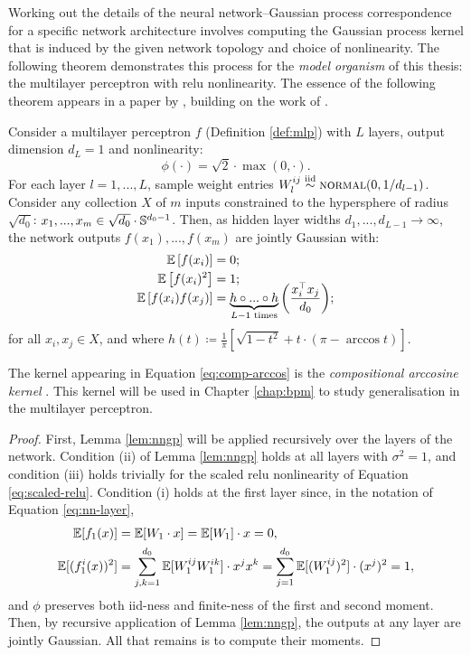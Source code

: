 \begin{refsection}
Working out the details of the neural network--Gaussian process correspondence for a specific network architecture involves computing the Gaussian process kernel that is induced by the given network topology and choice of nonlinearity. The following theorem demonstrates this process for the \textit{model organism} of this thesis: the multilayer perceptron with relu nonlinearity. The essence of the following theorem appears in a paper by \citet{lee2018deep}, building on the work of \citet{choandsaul}.

\begin{theorem}\label{thm:relu} Consider a multilayer perceptron $f$ (Definition \ref{def:mlp}) with $L$ layers, output dimension $d_L=1$ and nonlinearity:
\begin{equation}\label{eq:scaled-relu}
    \phi(\cdot) = \sqrt{2}\cdot\max(0,\cdot).
\end{equation}
For each layer $l=1,...,L$, sample weight entries $W_l^{ij} \overset{\mathrm{iid}}{\sim} \textsc{normal}(0,1/d_{l-1})$. Consider any collection $X$ of $m$ inputs constrained to the hypersphere of radius $\sqrt{d_0}$: $x_1, ..., x_m\in\sqrt{d_0}\cdot \mathbb{S}^{d_0-1}$. Then, as hidden layer widths $d_1,...,d_{L-1}\to \infty$, the network outputs $f(x_1),...,f(x_m)$ are jointly Gaussian with:
\begin{align}
\operatorname{\mathbb{E}} \left[ f(x_i) \right] &= 0;\\
\operatorname{\mathbb{E}} \smash{\left[ f(x_i)^2 \right]} &= 1;\\ 
\operatorname{\mathbb{E}} \left[ f(x_i) f(x_j)\right] &= \underbrace{h \circ ... \circ h}_{L-1\text{  times}}\smash{\left(\frac{x_i^\top x_j}{d_0}\right)}; \label{eq:comp-arccos}
\end{align}
for all $x_i, x_j \in X$, and where $h(t)\coloneqq  \tfrac{1}{\pi}\left[\sqrt{1-t^2} + t\cdot(\pi- \arccos t)\right]$.
\end{theorem}

The kernel appearing in Equation \ref{eq:comp-arccos} is the \textit{compositional arccosine kernel} \citep{choandsaul}. This kernel will be used in Chapter \ref{chap:bpm} to study generalisation in the multilayer perceptron.

\begin{proof} First, Lemma \ref{lem:nngp} will be applied recursively over the layers of the network. Condition (ii) of Lemma \ref{lem:nngp} holds at all layers with $\sigma^2 = 1$, and condition (iii) holds trivially for the scaled relu nonlinearity of Equation \ref{eq:scaled-relu}. Condition (i) holds at the first layer since, in the notation of Equation \ref{eq:nn-layer},
\begin{align}
\operatorname{\mathbb{E}}[f_1(x)] &= \operatorname{\mathbb{E}}[W_1 \cdot x] = \operatorname{\mathbb{E}}[W_1] \cdot x = 0, \nonumber\\ \operatorname{\mathbb{E}}[(f_1^i(x))^2] &= \sum_{j,k=1}^{d_0} \operatorname{\mathbb{E}}[W_1^{ij}W_1^{ik}] \cdot x^j x^k = \sum_{j=1}^{d_0} \operatorname{\mathbb{E}}[(W_1^{ij})^2] \cdot (x^j)^2 = 1, \label{eq:var-layer-1}
\end{align}
and $\phi$ preserves both iid-ness and finite-ness of the first and second moment. Then, by recursive application of Lemma \ref{lem:nngp}, the outputs at any layer are jointly Gaussian. All that remains is to compute their moments.


\end{proof}
\end{refsection}
